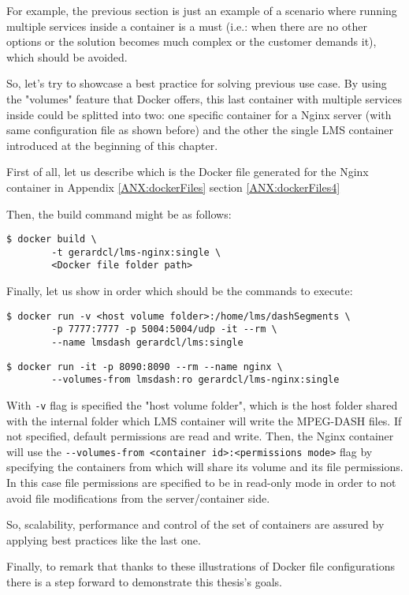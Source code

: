 For example, the previous section is just an example of a scenario where running multiple services inside a container is a must (i.e.: when there are no other options or the solution becomes much complex or the customer demands it), which should be avoided.

So, let's try to showcase a best practice for solving previous use case. By using the "volumes" feature that Docker offers, this last container with multiple services inside could be splitted into two: one specific container for a Nginx server (with same configuration file as shown before) and the other the single LMS container introduced at the beginning of this chapter. 

First of all, let us describe which is the Docker file generated for the Nginx container in Appendix
\ref{ANX:dockerFiles} section \ref{ANX:dockerFiles4}

Then, the build command might be as follows:

\begin{verbatim}
$ docker build \
		-t gerardcl/lms-nginx:single \
		<Docker file folder path>
\end{verbatim}

Finally, let us show in order which should be the commands to execute:

\begin{verbatim}
$ docker run -v <host volume folder>:/home/lms/dashSegments \
		-p 7777:7777 -p 5004:5004/udp -it --rm \
		--name lmsdash gerardcl/lms:single
\end{verbatim}

\begin{verbatim}
$ docker run -it -p 8090:8090 --rm --name nginx \
		--volumes-from lmsdash:ro gerardcl/lms-nginx:single 
\end{verbatim}

With \verb|-v| flag is specified the "host volume folder", which is the host folder shared with the internal folder which LMS container will write the MPEG-DASH files. If not specified, default permissions are read and write. Then, the Nginx container will use the \verb|--volumes-from <container id>:<permissions mode>| flag by specifying the containers from which will share its volume and its file permissions. In this case file permissions are specified to be in read-only mode in order to not avoid file modifications from the server/container side.  
 
So, scalability, performance and control of the set of containers are assured by applying best practices like the last one.

Finally, to remark that thanks to these illustrations of Docker file configurations there is a step forward to demonstrate this thesis's goals.
